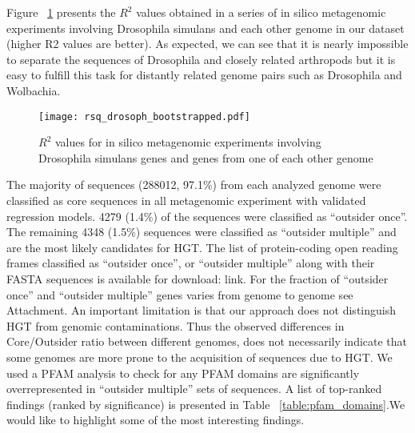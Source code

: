 Figure ~\ref{fig:rsquared_curve} presents the $R^2$ values obtained in a series of in silico metagenomic
experiments involving Drosophila simulans and each other genome in our dataset
(higher R2 values are better). As expected, we can see that it is nearly
impossible to separate the sequences of Drosophila and closely related
arthropods but it is easy to fulfill this task for distantly related genome
pairs such as Drosophila and Wolbachia.
\begin{center}
\begin{figure}
\texttt{[image: rsq\_drosoph\_bootstrapped.pdf]}
\caption{$R^2$ values for in silico metagenomic experiments involving Drosophila simulans genes and genes from one of each other genome}
\label{fig:rsquared_curve}
\end{figure}
\end{center}
The majority of sequences
(288012, 97.1\%) from each analyzed genome were classified as core sequences in
all metagenomic experiment with validated regression models. 4279 (1.4\%) of
the sequences were classified as “outsider once”. The remaining 4348 (1.5\%)
sequences were classified as “outsider multiple” and are the most likely
candidates for HGT. The list of protein-coding open reading frames classified
as “outsider once”, or “outsider multiple” along with their FASTA sequences is
available for download: link. For the fraction of “outsider once” and “outsider
multiple” genes varies from genome to genome see Attachment.
An important limitation is that our approach does not distinguish HGT from genomic
contaminations. Thus the observed differences in Core/Outsider ratio between
different genomes, does not necessarily indicate that some genomes are more
prone to the acquisition of sequences due to HGT. We used a PFAM analysis to
check for any PFAM domains are significantly overrepresented in “outsider
multiple” sets of sequences. A list of top-ranked findings (ranked by
significance) is presented in Table ~\ref{table:pfam_domains}.We would like to highlight some of the
most interesting findings.
\begin{center}
\end{center}

